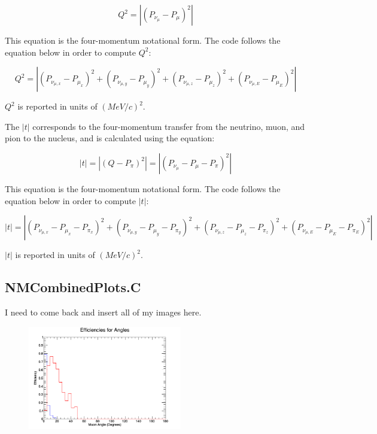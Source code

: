 \documentclass[11pt]{article}
\begin{document}
\begin{equation}
Q^2 = |(P_{\nu_\mu} - P_\mu)^2|
\end{equation}

\noindent
This equation is the four-momentum notational form. The code follows the equation below in order to compute $Q^2$:

\begin{equation}
Q^2 = |(P_{\nu_{\mu,x}} - P_{\mu_x})^2 + (P_{\nu_{\mu,y}} - P_{\mu_y})^2 + (P_{\nu_{\mu,z}} - P_{\mu_z})^2 + (P_{\nu_{\mu,E}} - P_{\mu_E})^2|
\end{equation}

\noindent
$Q^2$ is reported in units of $(MeV/c)^2$.

The $|t|$ corresponds to the four-momentum transfer from the neutrino, muon, and pion to the nucleus, and is calculated using the equation:

\begin{equation}
|t| = |(Q - P_\pi)^2| = |(P_{\nu_\mu} - P_\mu - P_\pi)^2|
\end{equation}

\noindent
This equation is the four-momentum notational form. The code follows the equation below in order to compute $|t|$:

\begin{equation}
|t| = |(P_{\nu_{\mu,x}} - P_{\mu_x} - P_{\pi_x})^2 + (P_{\nu_{\mu,y}} - P_{\mu_y} - P_{\pi_y})^2 + (P_{\nu_{\mu,z}} - P_{\mu_z} - P_{\pi_z})^2 + (P_{\nu_{\mu,E}} - P_{\mu_E} - P_{\pi_E})^2|
\end{equation}

\noindent
$|t|$ is reported in units of $(MeV/c)^2$.

\subsection{NMCombinedPlots.C}
I need to come back and insert all of my images here.

\begin{figure}[H]
\centering
\includegraphics[width=0.6\textwidth]{NMCombinedPlotsImages/1-NMCombinedPlots.png}
\caption{}
\end{figure}
\end{document}
